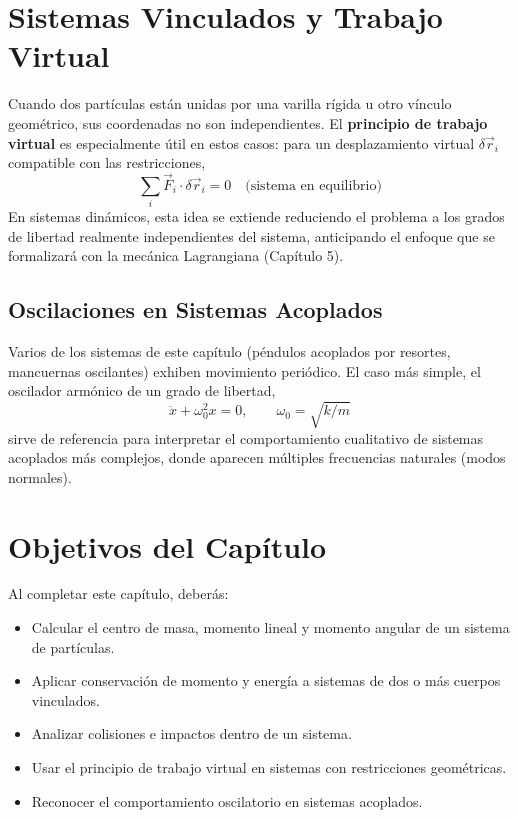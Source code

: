 \section{Sistemas Vinculados y Trabajo Virtual}

Cuando dos partículas están unidas por una varilla rígida u otro vínculo geométrico, sus coordenadas no son independientes. El \textbf{principio de trabajo virtual} es especialmente útil en estos casos: para un desplazamiento virtual $\delta \vec{r}_i$ compatible con las restricciones,
$$\sum_i \vec{F}_i \cdot \delta\vec{r}_i = 0 \quad \text{(sistema en equilibrio)}$$
En sistemas dinámicos, esta idea se extiende reduciendo el problema a los grados de libertad realmente independientes del sistema, anticipando el enfoque que se formalizará con la mecánica Lagrangiana (Capítulo 5).

\subsection*{Oscilaciones en Sistemas Acoplados}

Varios de los sistemas de este capítulo (péndulos acoplados por resortes, mancuernas oscilantes) exhiben movimiento periódico. El caso más simple, el oscilador armónico de un grado de libertad,
$$\ddot{x} + \omega_0^2 x = 0, \qquad \omega_0 = \sqrt{k/m}$$
sirve de referencia para interpretar el comportamiento cualitativo de sistemas acoplados más complejos, donde aparecen múltiples frecuencias naturales (modos normales).

\section*{Objetivos del Capítulo}

Al completar este capítulo, deberás:
\begin{itemize}
    \item Calcular el centro de masa, momento lineal y momento angular de un sistema de partículas.
    \item Aplicar conservación de momento y energía a sistemas de dos o más cuerpos vinculados.
    \item Analizar colisiones e impactos dentro de un sistema.
    \item Usar el principio de trabajo virtual en sistemas con restricciones geométricas.
    \item Reconocer el comportamiento oscilatorio en sistemas acoplados.
\end{itemize}

\newpage
